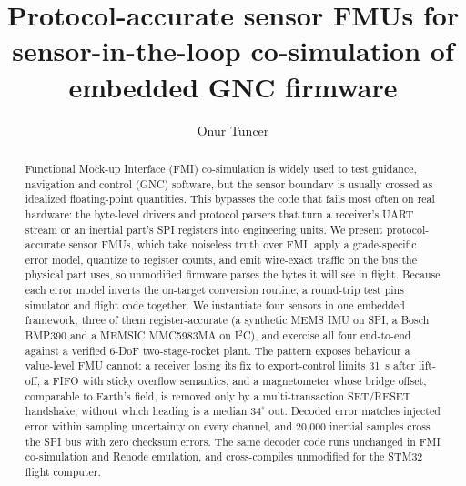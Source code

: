 \documentclass[preprint,12pt,a4paper]{elsarticle}
\begin{document}
\begin{frontmatter}

\title{Protocol-accurate sensor FMUs for sensor-in-the-loop co-simulation of
       embedded GNC firmware}

\author[itu]{Onur Tuncer}

\begin{abstract}
Functional Mock-up Interface (FMI) co-simulation is widely used to test
guidance, navigation and control (GNC) software, but the sensor boundary is
usually crossed as idealized floating-point quantities. This bypasses the
code that fails most often on real hardware: the byte-level drivers and
protocol parsers that turn a receiver's UART stream or an inertial part's SPI
registers into engineering units. We present protocol-accurate sensor FMUs,
which take noiseless truth over FMI, apply a grade-specific error model,
quantize to register counts, and emit wire-exact traffic on the bus the
physical part uses, so unmodified firmware parses the bytes it will see in
flight. Because each error model inverts the on-target conversion routine, a
round-trip test pins simulator and flight code together. We instantiate four sensors in one embedded
framework, three of them register-accurate (a synthetic MEMS IMU on SPI, a
Bosch BMP390 and a MEMSIC MMC5983MA on I$^2$C), and exercise all four end-to-end against a
verified 6-DoF two-stage-rocket plant. The pattern exposes behaviour a
value-level FMU cannot: a receiver losing its fix to export-control limits
31~s after lift-off, a FIFO with sticky overflow semantics, and a magnetometer
whose bridge offset, comparable to Earth's field, is removed only by a
multi-transaction SET/RESET handshake, without which heading is a median
$34^\circ$ out. Decoded error matches injected error within sampling
uncertainty on every channel, and 20,000 inertial samples cross the SPI bus
with zero checksum errors. The same decoder code runs unchanged in FMI
co-simulation and Renode emulation, and cross-compiles unmodified for the
STM32 flight computer.
\end{abstract}


\end{frontmatter}
\end{document}

